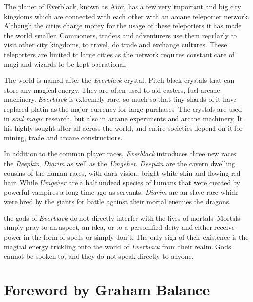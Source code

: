 \begin{enumerate}
  The planet of Everblack, known as Aror, has a
 few very important and big city kingdoms which are connected with each other
 with an arcane teleporter network. Although the cities charge money for the
 usage of these teleporters it has made the world smaller. Commoners, traders
 and adventurers use them regularly to visit other city kingdoms, to travel,
 do trade and exchange cultures. These teleporters are limited to large cities
 as the network requires constant care of magi and wizards to be kept
 operational.

  The world is named after the \emph{Everblack} crystal. Pitch
 black crystals that can store any magical energy. They are often used to aid
 casters, fuel arcane machinery. \emph{Everblack} is extremely rare, so much so
 that tiny shards of it have replaced platin as the major currency for large
 purchases. The crystals are used in \emph{soul magic} research, but also in
 arcane experiments and arcane machinery. It his highly sought after all across
 the world, and entire societies depend on it for mining, trade and arcane
 constructions.

  In addition to the common player races, \emph{Everblack}
 introduces three new races: the \emph{Deepkin}, \emph{Diarim} as well as
 the \emph{Umgeher}.  \emph{Deepkin} are the cavern dwelling cousins of the
 human races, with dark vision, bright white skin and flowing red
 hair. While \emph{Umgeher} are a half undead species of humans that were
 created by powerful vampires a long time ago as servants. \emph{Diarim} are
 an slave race which were bred by the giants for battle against their mortal
 enemies the dragons.

  the gods of \emph{Everblack} do not directly
 interfer with the lives of mortals. Mortals simply pray to an aspect, an idea,
 or to a personified deity and either receive power in the form of spells or
 simply don't. The only sign of their existence is the magical energy trickling
 onto the world of \emph{Everblack} from their realm. Gods cannot be spoken to,
 and they do not speak directly to anyone.

\end{enumerate}

\pagebreak

\onecolumn
\section{Foreword by Graham Balance}

